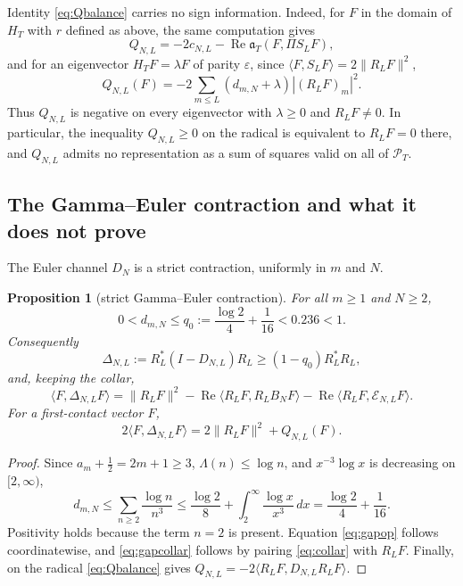 \documentclass[11pt]{amsart}
\newtheorem{proposition}[theorem]{Proposition}
\theoremstyle{definition}
\theoremstyle{remark}
\newcommand{\Rel}{\operatorname{Re}}
\newcommand{\PT}{\mathcal P_T}
\begin{document}
Identity \eqref{eq:Qbalance} carries no sign information. Indeed, for $F$ in the domain of $H_T$
with $r$ defined as above, the same computation gives
\begin{equation}\label{eq:Qrecombine}
 Q_{N,L}=-2c_{N,L}-\Rel\mathfrak a_T(F,\Pi S_LF),
\end{equation}
and for an eigenvector $H_TF=\lambda F$ of parity $\varepsilon$, since
$\langle F,S_LF\rangle=2\|R_LF\|^2$,
\begin{equation}\label{eq:Qspectral}
 Q_{N,L}(F)=-2\sum_{m\le L}(d_{m,N}+\lambda)|(R_LF)_m|^2.
\end{equation}
Thus $Q_{N,L}$ is negative on every eigenvector with $\lambda\ge0$ and $R_LF\ne0$. In particular, the
inequality $Q_{N,L}\ge0$ on the radical is equivalent to $R_LF=0$ there, and $Q_{N,L}$ admits no
representation as a sum of squares valid on all of $\PT$.

\subsection{The Gamma--Euler contraction and what it does not prove}

The Euler channel $D_N$ is a strict contraction, uniformly in $m$ and $N$.

\begin{proposition}[strict Gamma--Euler contraction]\label{prop:GEgap}
For all $m\ge1$ and $N\ge2$,
\[
 0<d_{m,N}\le q_0:=\frac{\log2}{4}+\frac1{16}<0.236<1.
\]
Consequently
\begin{equation}\label{eq:gapop}
 \Delta_{N,L}:=R_L^*(I-D_{N,L})R_L
 \ge(1-q_0)R_L^*R_L,
\end{equation}
and, keeping the collar,
\begin{equation}\label{eq:gapcollar}
 \langle F,\Delta_{N,L}F\rangle
 =\|R_LF\|^2-\Rel\langle R_LF,R_LB_NF\rangle
  -\Rel\langle R_LF,\mathcal E_{N,L}F\rangle.
\end{equation}
For a first-contact vector $F$,
\begin{equation}\label{eq:gapQ}
 2\langle F,\Delta_{N,L}F\rangle=2\|R_LF\|^2+Q_{N,L}(F).
\end{equation}
\end{proposition}
\begin{proof}
Since $a_m+\frac12=2m+1\ge3$, $\Lambda(n)\le\log n$, and $x^{-3}\log x$ is decreasing on $[2,\infty)$,
\[
 d_{m,N}\le\sum_{n\ge2}\frac{\log n}{n^3}
 \le\frac{\log2}{8}+\int_2^\infty\frac{\log x}{x^3}\,dx
 =\frac{\log2}{4}+\frac1{16}.
\]
Positivity holds because the term $n=2$ is present. Equation \eqref{eq:gapop} follows coordinatewise,
and \eqref{eq:gapcollar} follows by pairing \eqref{eq:collar} with $R_LF$. Finally, on the radical
\eqref{eq:Qbalance} gives $Q_{N,L}=-2\langle R_LF,D_{N,L}R_LF\rangle$.
\end{proof}
\end{document}
